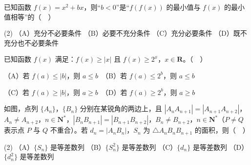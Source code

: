 \begin{question}
已知函数 \(f(x)=x^{2}+bx\)，则“\(b<0\)”是“\(f(f(x))\) 的最小值与 \(f(x)\) 的最小值相等”的（　）

\begin{gkopts}(2)
\task （A）充分不必要条件
\task （B）必要不充分条件
\task （C）充分必要条件
\task （D）既不充分也不必要条件
\end{gkopts}

\end{question}
\begin{question}
已知函数 \(f(x)\) 满足：\(f(x)\geqslant|x|\) 且 \(f(x)\geqslant2^{x}\)，\(x\in\mathbf{R}\)。（　）

（A）若 \(f(a)\leqslant|b|\)，则 \(a\leqslant b\)　（B）若 \(f(a)\leqslant2^{b}\)，则 \(a\leqslant b\)

（C）若 \(f(a)\geqslant|b|\)，则 \(a\geqslant b\)　（D）若 \(f(a)\geqslant2^{b}\)，则 \(a\geqslant b\)

\Needspace{0.4\textheight}
\end{question}
\begin{question}
如图，点列 \(\{A_{n}\}\)，\(\{B_{n}\}\) 分别在某锐角的两边上，且 \(|A_{n}A_{n+1}|=|A_{n+1}A_{n+2}|\)，\(A_{n}\neq A_{n+2}\)，\(n\in\mathbf{N}^{*}\)，\(|B_{n}B_{n+1}|=|B_{n+1}B_{n+2}|\)，\(B_{n}\neq B_{n+2}\)，\(n\in\mathbf{N}^{*}\)（\(P\neq Q\) 表示点 \(P\) 与 \(Q\) 不重合）。若 \(d_{n}=|A_{n}B_{n}|\)，\(S_{n}\) 为 \(\triangle A_{n}B_{n}B_{n+1}\) 的面积，则（　）
\nopagebreak[4]
\begin{center}\end{center}
\nopagebreak[4]
\begin{gkopts}(2)
\task （A）\(\{S_{n}\}\) 是等差数列
\task （B）\(\{S_{n}^{2}\}\) 是等差数列
\task （C）\(\{d_{n}\}\) 是等差数列
\task （D）\(\{d_{n}^{2}\}\) 是等差数列
\end{gkopts}

\end{question}

